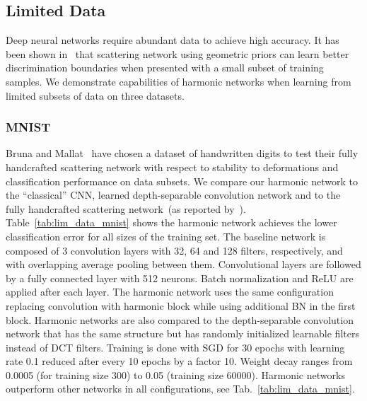 \documentclass[conference]{IEEEtran}
\begin{document}
\subsection{Limited Data} \label{sec:exp/lim_data}

Deep neural networks require abundant data to achieve high accuracy. It has been shown in~\cite{Bruna13,Oyallon18} that  scattering network using geometric priors can learn better discrimination boundaries when presented with a small subset of training samples. We demonstrate capabilities of harmonic networks when learning from limited subsets of data on three datasets.

\subsubsection{MNIST} \label{sec:lim_data/mnist}
Bruna and Mallat~\cite{Bruna13}  have chosen a dataset of handwritten digits to test their fully handcrafted scattering network with respect to stability to deformations and classification performance on data subsets. We compare our harmonic network to the ``classical'' CNN, learned depth-separable convolution network and to the fully handcrafted scattering network~(as reported by~\cite{Bruna13}).
Table~\ref{tab:lim_data_mnist} shows the harmonic network achieves the lower classification error for all sizes of the training set. The baseline network is composed of 3 convolution layers with 32, 64 and 128  filters, respectively, and with overlapping average pooling between them. Convolutional layers are followed by a fully connected layer with 512 neurons. Batch normalization and ReLU are applied after each layer. The harmonic network uses the same configuration replacing convolution with harmonic block while using additional BN in the first block. Harmonic networks are also compared to the depth-separable convolution network that has the same structure but has randomly initialized learnable filters instead of DCT filters. Training is done with SGD for 30 epochs with learning rate 0.1 reduced after every 10 epochs by a factor 10. Weight decay ranges from 0.0005 (for training size 300) to 0.05 (training size 60000). Harmonic networks outperform other networks in all configurations, see Tab.~\ref{tab:lim_data_mnist}.  
\end{document}
